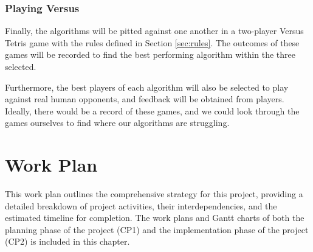 \documentclass[a4paper, 12pt]{extreport}
\begin{document}
	\subsection{Playing Versus}
	
	Finally, the algorithms will be pitted against one another in a two-player Versus Tetris game with the rules defined in Section \ref{sec:rules}. The outcomes of these games will be recorded to find the best performing algorithm within the three selected.
	
	Furthermore, the best players of each algorithm will also be selected to play against real human opponents, and feedback will be obtained from players. Ideally, there would be a record of these games, and we could look through the games ourselves to find where our algorithms are struggling.
	
	\chapter{Work Plan}
	
	
	This work plan outlines the comprehensive strategy for this project, providing a detailed breakdown of project activities, their interdependencies, and the estimated timeline for completion. The work plans and Gantt charts of both the planning phase of the project (CP1) and the implementation phase of the project (CP2) is included in this chapter.
	
\end{document}
